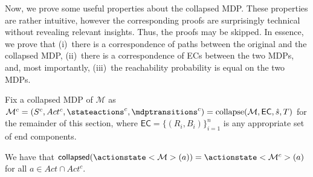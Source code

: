 \documentclass{theoretics}
\newcommand{\intersectionSym}{\cap}
\newcommand{\intersectionBin}{\mathbin{\intersectionSym}}
\newcommand{\intersection}{\intersectionBin}
\newcommand{\MDP}{\mathcal{M}}
\newcommand{\States}{S}
\newcommand{\initialstate}{\hat{s}}
\newcommand{\Actions}{Act}
\newcommand{\targetset}{T}
\DeclareMathOperator{\collapse}{collapse}
\newcommand{\eccollapsed}{\mathsf{collapsed}}
\newcommand{\algoecs}{\mathsf{EC}}
\begin{document}
Now, we prove some useful properties about the collapsed MDP.
These properties are rather intuitive, however the corresponding proofs are surprisingly technical without revealing relevant insights.
Thus, the proofs may be skipped.
In essence, we prove that (i)~there is a correspondence of paths between the original and the collapsed MDP, (ii)~there is a correspondence of ECs between the two MDPs, and, most importantly, (iii)~the reachability probability is equal on the two MDPs.

Fix a collapsed MDP of $\MDP$ as $\MDP^c = (\States^c, \Actions^c, \stateactions^c, \mdptransitions^c) = \collapse(\MDP, \algoecs, \initialstate, \targetset)$ for the remainder of this section, where $\algoecs = \{(R_i,B_i)\}_{i=1}^n$ is any appropriate set of end components.

\begin{lemma} \label{stm:collapse:collapse_actionstate}
	We have that $\eccollapsed(\actionstate<\MDP>(a)) = \actionstate<\MDP^c>(a)$ for all $a \in \Actions \intersection \Actions^c$.
\end{lemma}
\end{document}
